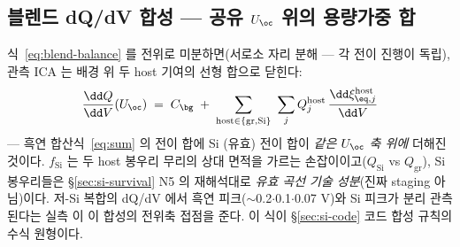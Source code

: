 \subsection{블렌드 dQ/dV 합성 --- 공유 $U_\oc$ 위의 용량가중 합}\label{ssec:blend-dqdv}
식~\eqref{eq:blend-balance} 를 전위로 미분하면(서로소 자리 분해 --- 각 전이 진행이 독립), 관측 ICA 는
배경 위 두 host 기여의 선형 합으로 닫힌다:
\begin{equation}
\frac{\dd Q}{\dd V}(U_\oc)\;=\;C_\bg\;+\;\sum_{\mathrm{host}\in\{\mathrm{gr},\mathrm{Si}\}}\ \sum_{j}Q_j^{\mathrm{host}}\,
\frac{\dd\xi_{\eq,j}^{\mathrm{host}}}{\dd V}
\label{eq:blend-dqdv}
\end{equation}
--- 흑연 합산식~\eqref{eq:sum} 의 전이 합에 Si (유효) 전이 합이 \emph{같은 $U_\oc$ 축 위에} 더해진 것이다.
$f_\mathrm{Si}$ 는 두 host 봉우리 무리의 상대 면적을 가르는 손잡이이고($Q_\mathrm{Si}$ vs $Q_\mathrm{gr}$),
Si 봉우리들은 \S\ref{sec:si-survival} N5 의 재해석대로 \emph{유효 곡선 기술 성분}(진짜 staging 아님)이다.
저-Si 복합의 dQ/dV 에서 흑연 피크($\sim$0.2$\cdot$0.1$\cdot$0.07 V)와 Si 피크가 분리 관측된다는
실측\cite{naboka_sic2021} 이 이 합성의 전위축 접점을 준다. 이 식이 \S\ref{sec:si-code} 코드 합성 규칙의
수식 원형이다.


